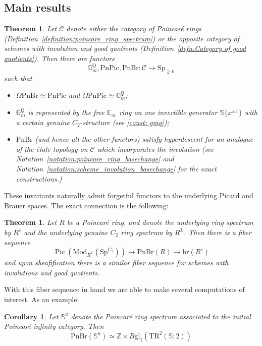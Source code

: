 \documentclass{article}
\DeclareMathOperator{\Pic}{Pic} %
\newcommand{\ZZ}{\mathbb{Z}}
\newcommand{\pnpic}{\ensuremath{\mathrm{PnPic}}}
\newcommand{\pnbr}{\ensuremath{\mathrm{PnBr}}}
\newtheorem{theorem}[equation]{Theorem}
\newtheorem{corollary}[equation]{Corollary}
\theoremstyle{definition}
\begin{document}
\subsection{Main results}
\begin{theorem}
    Let $\mathcal{C}$ denote either the category of Poincar{\'e} rings (Definition~\ref{definition:poincare_ring_spectrum}) or the opposite category of schemes with involution and good quotients (Definition~\ref{defn:Category of good quotients}). Then there are functors \[\mathbb{G}_m^\Qoppa, \pnpic, \pnbr:\mathcal{C}\to \mathrm{Sp}_{\geq 0}\] such that 
    \begin{itemize}
        \item $\Omega \pnbr\simeq \pnpic$ and $\Omega \pnpic\simeq \mathbb{G}_m^\Qoppa$;
        \item $\mathbb{G}_m^\Qoppa$ is represented by the free $\mathbb{E}_\infty$ ring on one invertible generator $\mathbb{S}\{x^{\pm 1}\}$ with a certain genuine $C_2$-structure (see \ref{const: gmq});
        \item $\pnbr$ (and hence all the other functors) satisfy hyperdescent for an analogue of the {\'e}tale topology on $\mathcal{C}$ which incorporates the involution (see Notation~\ref{notation:poincare_ring_basechange} and Notation~\ref{notation:scheme_involution_basechange} for the exact constructions.) 
    \end{itemize}
\end{theorem}

These invariants naturally admit forgetful functors to the underlying Picard and Brauer spaces. The exact connection is the following:

\begin{theorem}
    Let $R$ be a Poincar{\'e} ring, and denote the underlying ring spectrum by $R^e$ and the underlying genuine $C_2$ ring spectrum by $R^L$. Then there is a fiber sequence \[\Pic(\mathrm{Mod}_{R^L}(\mathrm{Sp}^{C_2}))\to \pnbr(R)\to \mathrm{br}(R^e)\] and upon sheafification there is a similar fiber sequence for schemes with involutions and good quotients.
\end{theorem}

With this fiber sequence in hand we are able to make several computations of interest. As an example:

\begin{corollary}
    Let $\mathbb{S}^u$ denote the Poincar{\'e} ring spectrum associated to the initial Poincar{\'e} infinity category. Then \[\pnbr(\mathbb{S}^u)\simeq \ZZ\times B\mathrm{gl}_1(\mathrm{TR}^2(\mathbb{S};2))\]
\end{corollary}
\end{document}
